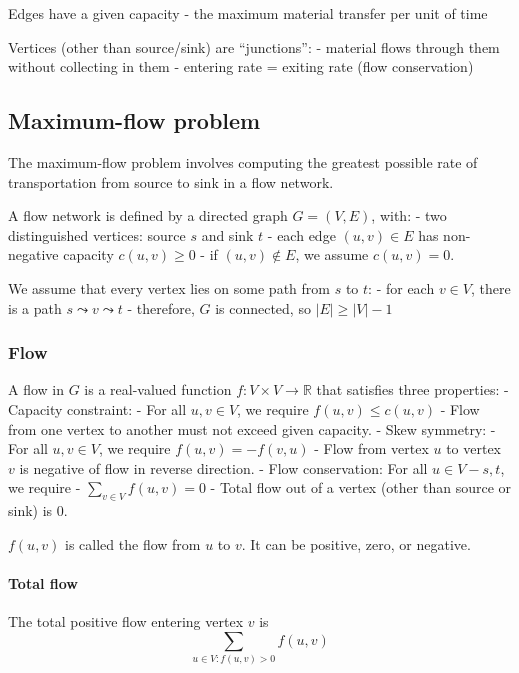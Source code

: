 \documentclass[11pt]{article}
\begin{document}
Edges have a given capacity - the maximum material transfer per unit of
time

Vertices (other than source/sink) are ``junctions'': - material flows
through them without collecting in them - entering rate = exiting rate
(flow conservation)

    \subsection{Maximum-flow problem}\label{maximum-flow-problem}

The maximum-flow problem involves computing the greatest possible rate
of transportation from source to sink in a flow network.

A flow network is defined by a directed graph \(G = (V,E)\), with: - two
distinguished vertices: source \(s\) and sink \(t\) - each edge
\((u, v) \in E\) has non-negative capacity \(c(u, v) \geq 0\) - if
\((u, v) \not\in E\), we assume \(c(u, v) = 0\).

We assume that every vertex lies on some path from \(s\) to \(t\): - for
each \(v \in V\), there is a path \(s \leadsto v \leadsto t\) -
therefore, \(G\) is connected, so \(|E| \geq |V| - 1\)

    \subsubsection{Flow}\label{flow}

A flow in \(G\) is a real-valued function
\(f : V \times V \rightarrow \mathbb{R}\) that satisfies three
properties: - Capacity constraint: - For all \(u, v \in V\), we require
\(f(u, v) \leq c(u, v)\) - Flow from one vertex to another must not
exceed given capacity. - Skew symmetry: - For all \(u, v \in V\), we
require \(f(u, v) = -f(v, u)\) - Flow from vertex \(u\) to vertex \(v\)
is negative of flow in reverse direction. - Flow conservation: For all
\(u \in V - {s,t}\), we require - \(\sum_{v \in V} f(u, v) = 0\) - Total
flow out of a vertex (other than source or sink) is 0.

\(f(u, v)\) is called the flow from \(u\) to \(v\). It can be positive,
zero, or negative.

\paragraph{Total flow}\label{total-flow}

The total positive flow entering vertex \(v\) is
\[\sum_{u \in V: f(u, v)>0} f(u, v)\]
\end{document}
